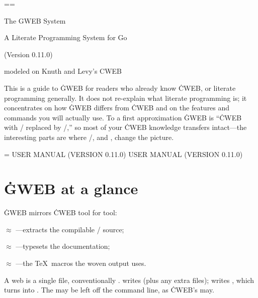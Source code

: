 \def\begincode{\par\medskip\begingroup
  \def\do##1{\catcode`##1=12 }\dospecials
  \catcode`\|=0
  \obeylines \obeyspaces \tt \parindent=0pt \leftskip=\parindent\relax}
\def\endcode{\endgroup\medskip\noindent}

\def\runninghead{{\ninett GWEB} USER MANUAL (VERSION 0.11.0)}
\def\lheader{\mainfont\folio\hfil{\sc\runninghead}\hfil}
\def\rheader{\hfil{\sc\runninghead}\hfil\mainfont\folio}

\headline={\hfil}\footline={\hfil}
\null\vfill
\centerline{\titlefont The {\ttitlefont GWEB} System}
\vskip 6pt
\centerline{\sectionfont A Literate Programming System for Go}
\vskip 18pt
\centerline{(Version 0.11.0)}
\vskip 24pt
\centerline{\authorfont modeled on Knuth and Levy's {\ttitlefont CWEB}}
\vfill
\noindent
This is a guide to \.{GWEB} for readers who already know \.{CWEB}, or
literate programming generally. It does not re-explain what literate programming
is; it concentrates on how \.{GWEB} differs from \.{CWEB} and on the features and
commands you will actually use. To a first approximation \.{GWEB} is ``\.{CWEB} with \CEE/
replaced by \GO/,'' so most of your \.{CWEB} knowledge transfers intact---the
interesting parts are where \GO/, and , change the picture.
\vfil\eject

\headline={\ifodd\pageno\rheader\else\lheader\fi}

\chapter{\.{GWEB} at a glance}
\noindent\.{GWEB} mirrors \.{CWEB} tool for tool:

\bull {} $\approx$ ---extracts the compilable \GO/ source;

\bull {} $\approx$ ---typesets the documentation;

\bull {} $\approx$ ---the \TeX\ macros the woven
output uses.

\noindent A web is a single file, conventionally . 
writes  (plus any extra files);  writes ,
which  turns into . The  may be left off the command
line, as \.{CWEB}'s  may.


